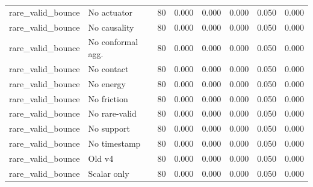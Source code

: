 {\begin{longtable}{llrrrrrr}
rare\_valid\_bounce & No actuator & 80 & 0.000 & 0.000 & 0.000 & 0.050 & 0.000 \\
rare\_valid\_bounce & No causality & 80 & 0.000 & 0.000 & 0.000 & 0.050 & 0.000 \\
rare\_valid\_bounce & No conformal agg. & 80 & 0.000 & 0.000 & 0.000 & 0.050 & 0.000 \\
rare\_valid\_bounce & No contact & 80 & 0.000 & 0.000 & 0.000 & 0.050 & 0.000 \\
rare\_valid\_bounce & No energy & 80 & 0.000 & 0.000 & 0.000 & 0.050 & 0.000 \\
rare\_valid\_bounce & No friction & 80 & 0.000 & 0.000 & 0.000 & 0.050 & 0.000 \\
rare\_valid\_bounce & No rare-valid & 80 & 0.000 & 0.000 & 0.000 & 0.050 & 0.000 \\
rare\_valid\_bounce & No support & 80 & 0.000 & 0.000 & 0.000 & 0.050 & 0.000 \\
rare\_valid\_bounce & No timestamp & 80 & 0.000 & 0.000 & 0.000 & 0.050 & 0.000 \\
rare\_valid\_bounce & Old v4 & 80 & 0.000 & 0.000 & 0.000 & 0.050 & 0.000 \\
rare\_valid\_bounce & Scalar only & 80 & 0.000 & 0.000 & 0.000 & 0.050 & 0.000 \\
\bottomrule
\end{longtable}
}
